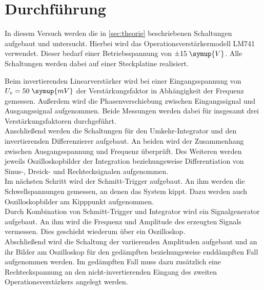 \section{Durchführung}
In diesem Versuch werden die in \autoref{sec:theorie} beschriebenen Schaltungen 
aufgebaut und untersucht. Hierbei wird das Operationsverstärkermodell LM741 verwendet.
Dieser bedarf einer Betriebsspannung von $\pm 15 \; \symup{V}$. Alle Schaltungen 
werden dabei auf einer Steckplatine realisiert.

Beim invertierenden Linearverstärker wird bei einer Eingangsspannung von $U_e = 50 \; \symup{mV}$
der Verstärkungsfaktor in Abhängigkeit der Frequenz gemessen. Außerdem wird die Phasenverschiebung
zwischen Eingangssignal und Ausgangssignal aufgenommen.
Beide Messungen werden dabei für insgesamt drei Verstärkungsfaktoren durchgeführt.\\
Anschließend werden die Schaltungen für den Umkehr-Integrator und den invertierenden 
Differenzierer aufgebaut. An beiden wird der Zusammenhang zwischen Ausgangsspannung und 
Frequenz überprüft. Des Weiteren werden jeweils Oszilloskopbilder der Integration beziehungsweise
Differentiation von Sinus-, Dreick- und Rechtecksignalen aufgenommen. \\
Im nächsten Schritt wird der Schmitt-Trigger aufgebaut. An ihm werden die Schwellspannungen 
gemessen, an denen das System kippt. Dazu werden auch Oszilloskopbilder am Kipppunkt aufgenommen.\\
Durch Kombination von Schmitt-Trigger und Integrator wird ein Signalgenerator aufgebaut.
An ihm wird die Frequenz und Amplitude des erzeugten Signals vermessen. Dies geschieht wiederum 
über ein Oszilloskop. \\
Abschließend wird die Schaltung der variierenden Amplituden aufgebaut und an ihr Bilder 
am Oszilloskop für den gedämpften beziehungsweise enddämpften Fall aufgenommen werden.
Im gedämpften Fall muss dazu zusätzlich eine Rechteckspannung an den nicht-invertierenden 
Eingang des zweiten Operationsverstärkers angelegt werden.  